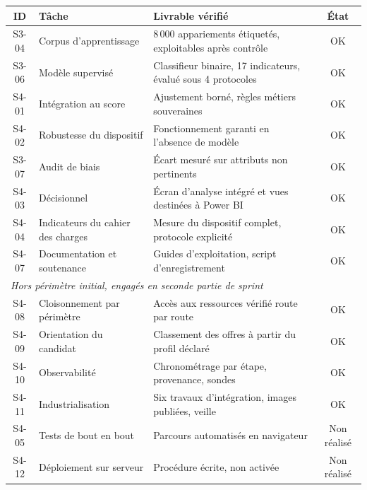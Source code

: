 \documentclass[11pt,a4paper]{article}
\begin{document}
\begin{center}
\small
\begin{tabular}{clp{6.4cm}c}
  \toprule
  \textbf{ID} & \textbf{Tâche} & \textbf{Livrable vérifié} & \textbf{État} \\
  \midrule
  S3-04 & Corpus d'apprentissage & 8\,000 appariements étiquetés, exploitables après contrôle & \textcolor{vert}{OK} \\
  S3-06 & Modèle supervisé & Classifieur binaire, 17 indicateurs, évalué sous 4 protocoles & \textcolor{vert}{OK} \\
  S4-01 & Intégration au score & Ajustement borné, règles métiers souveraines & \textcolor{vert}{OK} \\
  S4-02 & Robustesse du dispositif & Fonctionnement garanti en l'absence de modèle & \textcolor{vert}{OK} \\
  S3-07 & Audit de biais & Écart mesuré sur attributs non pertinents & \textcolor{vert}{OK} \\
  S4-03 & Décisionnel & Écran d'analyse intégré et vues destinées à Power BI & \textcolor{vert}{OK} \\
  S4-04 & Indicateurs du cahier des charges & Mesure du dispositif complet, protocole explicité & \textcolor{vert}{OK} \\
  S4-07 & Documentation et soutenance & Guides d'exploitation, script d'enregistrement & \textcolor{vert}{OK} \\
  \midrule
  \multicolumn{4}{l}{\textit{Hors périmètre initial, engagés en seconde partie de sprint}} \\[1mm]
  S4-08 & Cloisonnement par périmètre & Accès aux ressources vérifié route par route & \textcolor{vert}{OK} \\
  S4-09 & Orientation du candidat & Classement des offres à partir du profil déclaré & \textcolor{vert}{OK} \\
  S4-10 & Observabilité & Chronométrage par étape, provenance, sondes & \textcolor{vert}{OK} \\
  S4-11 & Industrialisation & Six travaux d'intégration, images publiées, veille & \textcolor{vert}{OK} \\
  \midrule
  S4-05 & Tests de bout en bout & Parcours automatisés en navigateur & \textcolor{ambre}{Non réalisé} \\
  S4-12 & Déploiement sur serveur & Procédure écrite, non activée & \textcolor{ambre}{Non réalisé} \\
  \bottomrule
\end{tabular}
\end{center}
\end{document}
